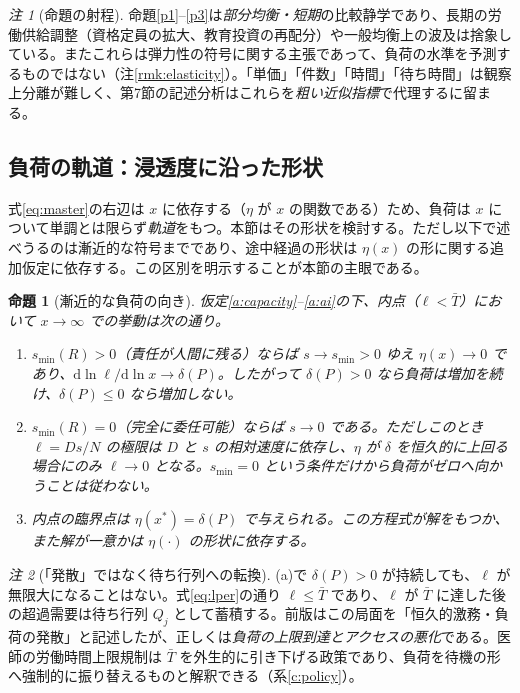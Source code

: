 \documentclass[11pt]{article}
\theoremstyle{plain}
\newtheorem{prop}{命題}
\theoremstyle{definition}
\theoremstyle{remark}
\newtheorem*{rmk}{注}
\begin{document}
\begin{rmk}[命題の射程]
命題\ref{p1}--\ref{p3}は\emph{部分均衡・短期}の比較静学であり、長期の労働供給調整（資格定員の拡大、教育投資の再配分）や一般均衡上の波及は捨象している。またこれらは弾力性の符号に関する主張であって、負荷の水準を予測するものではない（注\ref{rmk:elasticity}）。「単価」「件数」「時間」「待ち時間」は観察上分離が難しく、第7節の記述分析はこれらを\emph{粗い近似指標}で代理するに留まる。
\end{rmk}

\subsection{負荷の軌道：浸透度に沿った形状}\label{sec:dyn}
式\eqref{eq:master}の右辺は $x$ に依存する（$\eta$ が $x$ の関数である）ため、負荷は $x$ について単調とは限らず\emph{軌道}をもつ。本節はその形状を検討する。ただし以下で述べうるのは漸近的な符号までであり、途中経過の形状は $\eta(x)$ の形に関する追加仮定に依存する。この区別を明示することが本節の主眼である。

\begin{prop}[漸近的な負荷の向き]\label{p:hump}
仮定\ref{a:capacity}--\ref{a:ai}の下、内点（$\ell<\bar T$）において $x\to\infty$ での挙動は次の通り。
\begin{enumerate}[label=(\alph*),leftmargin=1.6em,itemsep=1pt]
\item $s_{\min}(R)>0$（責任が人間に残る）ならば $s\to s_{\min}>0$ ゆえ $\eta(x)\to0$ であり、$\mathrm d\ln\ell/\mathrm d\ln x\to\delta(P)$。したがって $\delta(P)>0$ なら負荷は\emph{増加を続け}、$\delta(P)\le0$ なら増加しない。
\item $s_{\min}(R)=0$（完全に委任可能）ならば $s\to0$ である。ただしこのとき $\ell=Ds/N$ の極限は $D$ と $s$ の\emph{相対速度}に依存し、$\eta$ が $\delta$ を恒久的に上回る場合にのみ $\ell\to0$ となる。$s_{\min}=0$ という条件だけから負荷がゼロへ向かうことは従わない。
\item 内点の臨界点は $\eta(x^\ast)=\delta(P)$ で与えられる。この方程式が解をもつか、また解が一意かは $\eta(\cdot)$ の形状に依存する。
\end{enumerate}
\end{prop}

\begin{rmk}[「発散」ではなく待ち行列への転換]
(a)で $\delta(P)>0$ が持続しても、$\ell$ が無限大になることはない。式\eqref{eq:lper}の通り $\ell\le\bar T$ であり、$\ell$ が $\bar T$ に達した後の超過需要は待ち行列 $Q_j$ として蓄積する。前版はこの局面を「恒久的激務・負荷の発散」と記述したが、正しくは\emph{負荷の上限到達とアクセスの悪化}である。医師の労働時間上限規制は $\bar T$ を外生的に引き下げる政策であり、負荷を待機の形へ強制的に振り替えるものと解釈できる（系\ref{c:policy}）。
\end{rmk}
\end{document}
